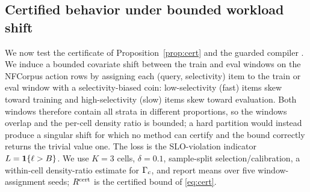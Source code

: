
\subsection{Certified behavior under bounded workload shift}
\label{sec:results-cert}

We now test the certificate of Proposition~\ref{prop:cert} and the guarded compiler \CWC{}. We induce a bounded covariate shift between the train and eval windows on the NFCorpus action rows by assigning each (query, selectivity) item to the train or eval window with a selectivity-biased coin: low-selectivity (fast) items skew toward training and high-selectivity (slow) items skew toward evaluation. Both windows therefore contain all strata in different proportions, so the windows overlap and the per-cell density ratio is bounded; a hard partition would instead produce a singular shift for which no method can certify and the bound correctly returns the trivial value one. The loss is the SLO-violation indicator $L=\mathbf{1}\{\ell>B\}$. We use $K{=}3$ cells, $\delta{=}0.1$, sample-split selection/calibration, a within-cell density-ratio estimate for $\Gamma_c$, and report means over five window-assignment seeds; $R^{\mathrm{cert}}$ is the certified bound of \eqref{eq:cert}.

